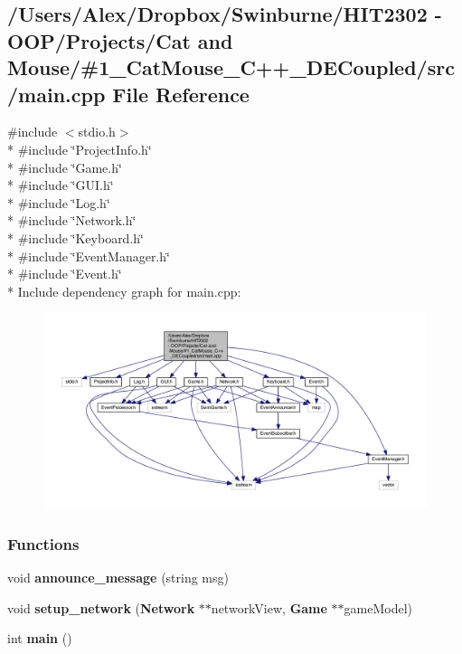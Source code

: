 \subsection{/\-Users/\-Alex/\-Dropbox/\-Swinburne/\-H\-I\-T2302 -\/ O\-O\-P/\-Projects/\-Cat and Mouse/\#1\-\_\-\-Cat\-Mouse\-\_\-\-C++\-\_\-\-D\-E\-Coupled/src/main.cpp File Reference}
\label{main_8cpp}
{\ttfamily \#include $<$stdio.\-h$>$}\\*
{\ttfamily \#include \char`\"{}Project\-Info.\-h\char`\"{}}\\*
{\ttfamily \#include \char`\"{}Game.\-h\char`\"{}}\\*
{\ttfamily \#include \char`\"{}G\-U\-I.\-h\char`\"{}}\\*
{\ttfamily \#include \char`\"{}Log.\-h\char`\"{}}\\*
{\ttfamily \#include \char`\"{}Network.\-h\char`\"{}}\\*
{\ttfamily \#include \char`\"{}Keyboard.\-h\char`\"{}}\\*
{\ttfamily \#include \char`\"{}Event\-Manager.\-h\char`\"{}}\\*
{\ttfamily \#include \char`\"{}Event.\-h\char`\"{}}\\*
Include dependency graph for main.\-cpp\-:
\nopagebreak
\begin{figure}[H]
\begin{center}
\leavevmode
\includegraphics[width=350pt]{main_8cpp__incl}
\end{center}
\end{figure}
\subsubsection*{Functions}
\begin{DoxyCompactItemize}
\item 
void {\bf announce\-\_\-message} (string msg)
\item 
void {\bf setup\-\_\-network} ({\bf Network} $\ast$$\ast$network\-View, {\bf Game} $\ast$$\ast$game\-Model)
\item 
int {\bf main} ()
\end{DoxyCompactItemize}



